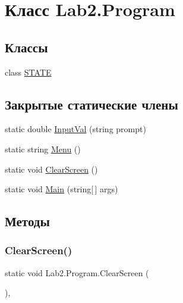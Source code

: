 \hypertarget{class_lab2_1_1_program}{}\section{Класс Lab2.\+Program}
\label{class_lab2_1_1_program}
\subsection*{Классы}
\begin{DoxyCompactItemize}
\item 
class \hyperlink{class_lab2_1_1_program_1_1_s_t_a_t_e}{S\+T\+A\+TE}
\end{DoxyCompactItemize}
\subsection*{Закрытые статические члены}
\begin{DoxyCompactItemize}
\item 
static double \hyperlink{class_lab2_1_1_program_ad2d2274d45b38fc9290361216486e80e}{Input\+Val} (string prompt)
\item 
static string \hyperlink{class_lab2_1_1_program_af02bc1eac4648c46552fb6f266310e2e}{Menu} ()
\item 
static void \hyperlink{class_lab2_1_1_program_acd4a36315339b36b9c0ade061eda97be}{Clear\+Screen} ()
\item 
static void \hyperlink{class_lab2_1_1_program_a27a77b796d70d0e23c1a5d7db283b845}{Main} (string\mbox{[}$\,$\mbox{]} args)
\end{DoxyCompactItemize}


\subsection{Методы}
\mbox{\label{class_lab2_1_1_program_acd4a36315339b36b9c0ade061eda97be}} 
\subsubsection{\texorpdfstring{Clear\+Screen()}{ClearScreen()}}
{\footnotesize\ttfamily static void Lab2.\+Program.\+Clear\+Screen (\begin{DoxyParamCaption}{ }\end{DoxyParamCaption})\hspace{0.3cm}{\ttfamily [static]}, {\ttfamily [private]}}

